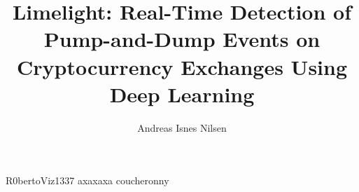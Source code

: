 \documentclass[USenglish,glsresetperchapter,a4paper]{uit-thesis}
\newcommand{\project}{Limelight\xspace}
\begin{document}
\title{\project: Real-Time Detection of Pump-and-Dump Events on Cryptocurrency Exchanges Using Deep Learning}
\author{Andreas Isnes Nilsen}
\maketitle
\frontmatter

\newcommand{\thesisquote}[2]{\emph{“#1”} -- #2 \\[2\baselineskip]}




\begin{acknowledgement}
R0bertoViz1337
axaxaxa
coucheronny
\end{acknowledgement}

\tableofcontents
\listoflistings
\printacronyms[style=ult-super]

\mainmatter
% 
% 
% 
% 

% 

\printbibliography[heading=bibintoc,title=References]

\backmatter
\end{document}
